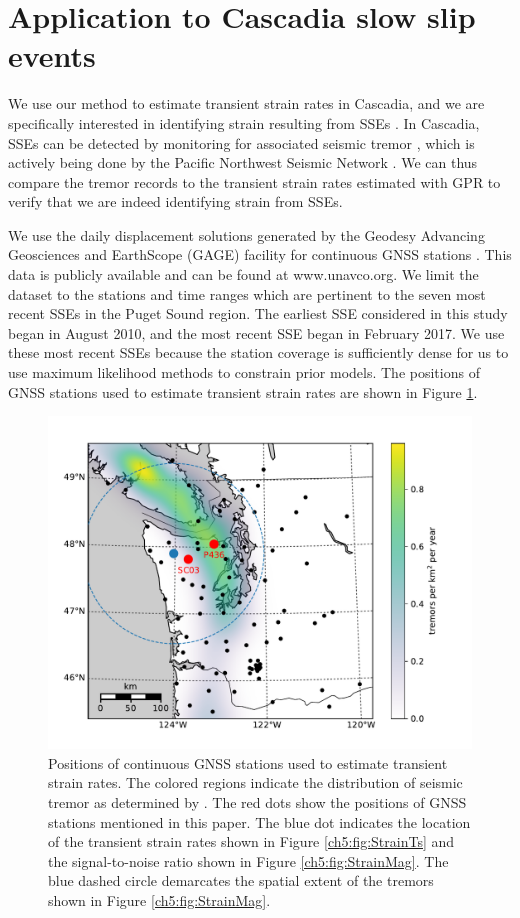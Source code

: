 \section{Application to Cascadia slow slip events}\label{ch5:sec:Cascadia}
We use our method to estimate transient strain rates in Cascadia, and
we are specifically interested in identifying strain resulting from
SSEs \citep[e.g.,][]{Dragert2001}. In Cascadia, SSEs can be detected
by monitoring for associated seismic tremor \citep{Rogers2003}, which
is actively being done by the Pacific Northwest Seismic Network
\citep{Wech2010}. We can thus compare the tremor records to the
transient strain rates estimated with GPR to verify that we are indeed
identifying strain from SSEs.

We use the daily displacement solutions generated by the Geodesy
Advancing Geosciences and EarthScope (GAGE) facility for continuous
GNSS stations \citep{Herring2016}. This data is publicly available and
can be found at www.unavco.org. We limit the dataset to the stations
and time ranges which are pertinent to the seven most recent SSEs in
the Puget Sound region. The earliest SSE considered in this study
began in August 2010, and the most recent SSE began in February 2017.
We use these most recent SSEs because the station coverage is
sufficiently dense for us to use maximum likelihood methods to
constrain prior models.  The positions of GNSS stations used to
estimate transient strain rates are shown in Figure
\ref{ch5:fig:Context}.

\begin{figure}
\includegraphics{ch5/figures/context_map/context-map.pdf}
\caption{Positions of continuous GNSS stations used to estimate
transient strain rates. The colored regions indicate the distribution
of seismic tremor as determined by \citet{Wech2010}. The red dots show
the positions of GNSS stations mentioned in this paper. The blue dot
indicates the location of the transient strain rates shown in Figure
\ref{ch5:fig:StrainTs} and the signal-to-noise ratio shown in Figure
\ref{ch5:fig:StrainMag}. The blue dashed circle demarcates the spatial
extent of the tremors shown in Figure \ref{ch5:fig:StrainMag}.}
\label{ch5:fig:Context}
\end{figure}

